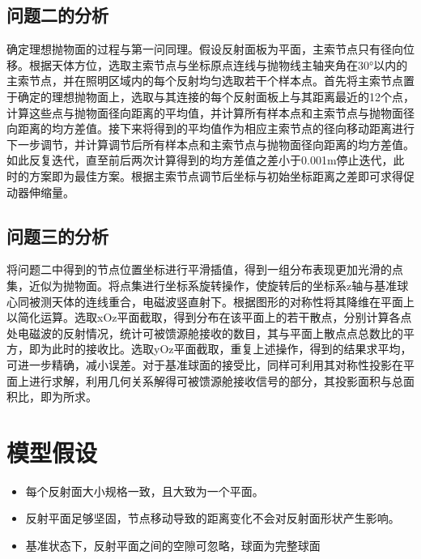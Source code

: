 \documentclass[withoutpreface,bwprint]{cumcmthesis} %
\begin{document}
	\subsection{问题二的分析}
	确定理想抛物面的过程与第一问同理。假设反射面板为平面，主索节点只有径向位移。根据天体方位，选取主索节点与坐标原点连线与抛物线主轴夹角在30°以内的主索节点，并在照明区域内的每个反射均匀选取若干个样本点。首先将主索节点置于确定的理想抛物面上，选取与其连接的每个反射面板上与其距离最近的12个点，计算这些点与抛物面径向距离的平均值，并计算所有样本点和主索节点与抛物面径向距离的均方差值。接下来将得到的平均值作为相应主索节点的径向移动距离进行下一步调节，并计算调节后所有样本点和主索节点与抛物面径向距离的均方差值。如此反复迭代，直至前后两次计算得到的均方差值之差小于0.001m停止迭代，此时的方案即为最佳方案。根据主索节点调节后坐标与初始坐标距离之差即可求得促动器伸缩量。
	
	\subsection{问题三的分析}
	将问题二中得到的节点位置坐标进行平滑插值，得到一组分布表现更加光滑的点集，近似为抛物面。将点集进行坐标系旋转操作，使旋转后的坐标系z轴与基准球心同被测天体的连线重合，电磁波竖直射下。根据图形的对称性将其降维在平面上以简化运算。选取xOz平面截取，得到分布在该平面上的若干散点，分别计算各点处电磁波的反射情况，统计可被馈源舱接收的数目，其与平面上散点点总数比的平方，即为此时的接收比。选取yOz平面截取，重复上述操作，得到的结果求平均，可进一步精确，减小误差。对于基准球面的接受比，同样可利用其对称性投影在平面上进行求解，利用几何关系解得可被馈源舱接收信号的部分，其投影面积与总面积比，即为所求。
	
	\section{模型假设}
		\begin{itemize}
		\item 每个反射面大小规格一致，且大致为一个平面。
		\item 反射平面足够坚固，节点移动导致的距离变化不会对反射面形状产生影响。
		\item 基准状态下，反射平面之间的空隙可忽略，球面为完整球面
	\end{itemize}
	
\end{document}
